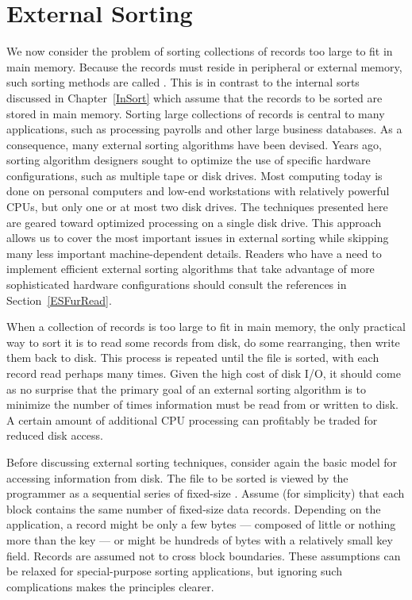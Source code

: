 \section{External Sorting}
\label{ExternalSortSec}

We now consider the problem of sorting collections of
records too large to fit in main memory.
Because the records must reside in peripheral or external memory,
such sorting methods are called .
This is in contrast to the internal sorts discussed in
Chapter~\ref{InSort} which assume that the records to be sorted are
stored in main memory.
Sorting large collections of records is central to many applications,
such as processing payrolls and other large business databases.
As a consequence, many external sorting algorithms have been devised.
Years ago, sorting algorithm designers sought to optimize
the use of specific hardware configurations, such as multiple
tape or disk drives.
Most computing today is done on personal computers and low-end
workstations with relatively powerful CPUs, but only one or at most
two disk drives.
The techniques presented here are geared toward
optimized processing on a single disk drive.
This approach allows us to cover the most important issues in
external sorting while skipping many less important machine-dependent
details.
Readers who have a need to implement efficient external sorting
algorithms that take advantage of more sophisticated hardware
configurations should consult the references in
Section~\ref{ESFurRead}.

When a collection of records is too large to fit in main memory,
the only practical way to sort it is to read some records from disk,
do some rearranging, then write them back to disk.
This process is repeated until the file is sorted, with each record
read perhaps many times.
Given the high cost of disk I/O, it should come as no surprise that
the primary goal of an external sorting algorithm is to minimize the
number of times information must be read from or written to disk.
A certain amount of additional CPU processing can profitably be traded
for reduced disk access.

Before discussing external sorting techniques, consider again the
basic model for accessing information from disk.
The file to be sorted is viewed by the programmer as a sequential
series of fixed-size .
Assume (for simplicity) that each block contains the same
number of fixed-size data records.
Depending on the application, a record might be only a few bytes ---
composed of little or nothing more than the key --- or might be
hundreds of bytes with a relatively small key field.
Records are assumed not to cross block boundaries.
These assumptions can be relaxed for special-purpose sorting
applications, but ignoring such complications makes the principles
clearer.

